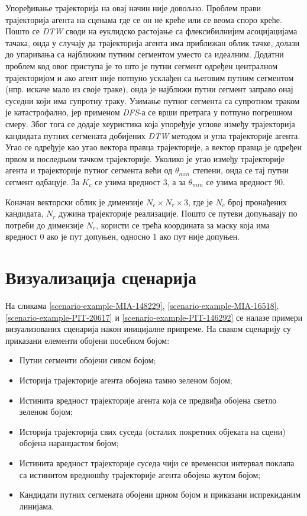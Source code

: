 \documentclass[11pt,oneside]{memoir}
\begin{document}
Упоређивање трајекторија на овај начин није довољно. Проблем прави трајекторија агента на сценама где се он не креће или се веома споро креће. Пошто
се \textit{DTW} своди на еуклидско растојање са флексибилнијим асоцијацијама тачака, 
онда у случају да трајекторија агента има приближан облик тачке, долази до упаривања са најближим путним сегментом уместо са идеалним. Додатни проблем 
код овог приступа је
то што је путни сегмент одређен централном трајекторијом и ако агент није потпуно усклађен са његовим путним сегментом (нпр. искаче мало
из своје траке), онда је 
најближи путни сегмент заправо онај суседни који има супротну траку. Узимање путног сегмента са супротном траком је катастрофално,
јер применом \textit{DFS}-а се врши претрага у потпуно погрешном смеру. Због тога се додаје хеуристика која упоређује углове између
трајекторија кандидата путних сегмената добијених \textit{DTW} методом и угла трајекторије агента. Угао се одређује као угао вектора правца
трајекторије, а вектор правца је одређен првом и последњом тачком трајекторије. Уколико је угао између трајекторије агента и 
трајекторије путног сегмента већи од $\theta_{min}$ степени, онда се тај путни сегмент одбацује. За $K_c$ се узима вредност 3, а
за $\theta_{min}$ се узима вредност 90.

Коначан векторски облик је димензије $N_c\times N_r\times 3$, где је $N_c$ број пронађених кандидата,
$N_r$ дужина трајекторије реализације. Пошто се путеви допуњавају по потреби до димензије $N_r$, користи се трећа координата
за маску која има вредност 0 ако је пут допуњен, односно 1 ако пут није допуњен. 

\section{Визуализација сценарија}

На сликама \ref{scenario-example-MIA-148229}, \ref{scenario-example-MIA-16518}, \ref{scenario-example-PIT-20617} и \ref{scenario-example-PIT-146292} 
се налазе примери визуализованих сценарија након иницијалне припреме. На сваком сценарију су приказани елементи обојени посебном бојом:
\begin{itemize}
  \item Путни сегменти обојени сивом бојом;
  \item Историја трајекторије агента обојена тамно зеленом бојом;
  \item Истинита вредност трајекторије агента која се предвиђа обојена светло зеленом бојом;
  \item Историја трајекторија свих суседа (осталих покретних објеката на сцени) обојена наранџастом бојом;
  \item Истинита вредност трајекторије суседа чији се временски интервал поклапа са истинитом вредношћу трајекторије агента обојена жутом бојом;
  \item Кандидати путних сегмената обојени црном бојом и приказани испрекиданим линијама.
\end{itemize}
\end{document}
